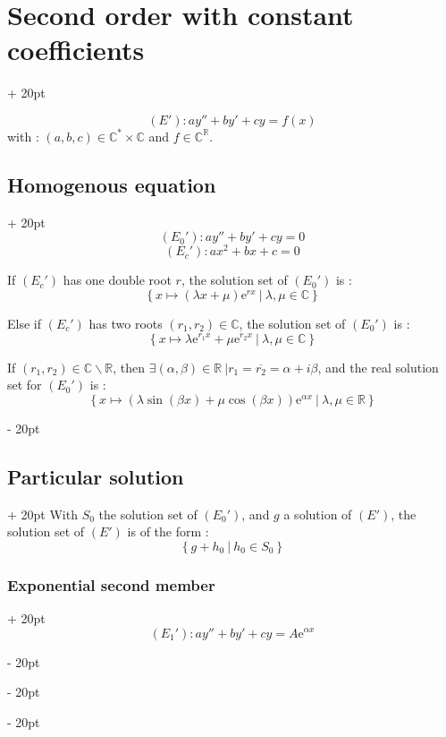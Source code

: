\documentclass[a4paper, 12pt, twoside]{article}
\newcommand{\R}{\mathbb{R}} %
\newcommand{\C}{\mathbb{C}} %
\newcommand{\e}[1]{\mathrm{e}^{#1}}
\newcommand{\cj}[1]{\overline{#1}} %
\newcommand{\lrs}[1]{\left\{ #1 \right\}}
\newcommand{\ind}[1][20pt]{\advance\leftskip + #1}
\newcommand{\deind}[1][20pt]{\advance\leftskip - #1}
\newenvironment{indentedenv}[1][20pt]{\par \ind[#1]}{\par \deind}
\newenvironment{indt}[2][20pt]{#2 \begin{indentedenv}[#1]}{\end{indentedenv}} %
\begin{document}
    \begin{indt}{\section{Second order with constant coefficients}}
        
        \[ (E') : ay'' + by' + cy = f(x) \]
        with : $(a, b, c) \in \C^* \times \C$ and $f \in \C^\R$.
        
        \begin{indt}{\subsection{Homogenous equation}}
            \[ (E_0') : ay'' + by' + cy = 0 \]
            \[ (E_c') : ax^2 + bx + c = 0 \]
            
            \vspace{6pt}
            
            If $(E_c')$ has one double root $r$, the solution set of $(E_0')$ is :
            \[ \lrs{x \longmapsto (\lambda x + \mu)\e{rx} \ | \ \lambda, \mu \in \C} \]
            
            \vspace{6pt}
            
            Else if $(E_c')$ has two roots $(r_1, r_2) \in \C$, the solution set of $(E_0')$ is :
            \[ \lrs{x \longmapsto \lambda\e{r_1 x} + \mu\e{r_2 x}\ |\ \lambda, \mu \in \C} \]
            
            \vspace{6pt}
            
            If $(r_1, r_2) \in \C \backslash \R$, then $\exists (\alpha, \beta) \in \R\ | r_1 = \cj{r_2} = \alpha + i\beta$, and the real solution set for $(E_0')$ is :
            \[ \lrs{x \longmapsto (\lambda\sin(\beta x) + \mu\cos(\beta x))\e{\alpha x}\ | \ \lambda, \mu \in \R} \]
        \end{indt}
        
        \begin{indt}{\subsection{Particular solution}}
            With $S_0$ the solution set of $(E_0')$, and $g$ a solution of $(E')$, the solution set of $(E')$ is of the form :
            \[ \lrs{g + h_0 \ | \ h_0 \in S_0} \]
            
            \begin{indt}{\subsubsection{Exponential second member}}
                \[(E_1') : ay'' + by' + cy = A\e{\alpha x}\]
                

\end{indt}
\end{indt}
\end{indt}
\end{document}
